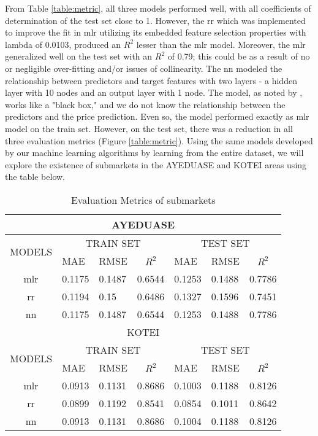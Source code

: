 \begin{sloppypar}
	\hspace*{-0.6cm}From Table \ref{table:metric}, all three models performed well, with all coefficients of determination of the test set close to 1. However, the \ac{rr} which was implemented to improve the fit in \ac{mlr} utilizing its embedded feature selection properties with lambda of 0.0103, produced an $ R^2 $ lesser than the \ac{mlr} model. Moreover, the \ac{mlr} generalized well on the test set with an $ R^2 $ of 0.79; this could be as a result of no or negligible over-fitting and/or issues of collinearity. \newline
	The \ac{nn} modeled the relationship between predictors and target features with two layers - a hidden layer with 10 nodes and an output layer with 1 node. The model, as noted by \citep{Phan2019}, works like a "black box," and we do not know the relationship between the predictors and the price prediction. Even so, the model performed exactly as \ac{mlr} model on the train set. However, on the test set, there was a reduction in all three evaluation metrics (Figure \ref{table:metric}).
	\newpage  
	\hspace*{-0.6cm}Using the same models developed by our machine learning algorithms by learning from the entire dataset, we will explore the existence of submarkets \citep{maclennan1996economic} in the AYEDUASE and KOTEI areas using the table below.
	
	\begin{table}[h!]
		\centering
		\caption{Evaluation Metrics of submarkets}
		\label{table:metric2}
		\begin{tabular}{|c|p{1.5cm}p{1.5cm}c|p{1.5cm}p{1.5cm}c|}
			\hline
			\multicolumn{7}{|c|}{AYEDUASE} \\
			\hline \hline
			\multirow{2}{*}{MODELS} & \multicolumn{3}{|c|}{TRAIN SET} & \multicolumn{3}{|c|}{TEST SET} \\ \cline{2-7}
			& MAE & RMSE & $R^2$ & MAE & RMSE & $R^2$ \\ \hline
			\ac{mlr} & 0.1175 & 0.1487 & 0.6544 & 0.1253 & 0.1488 & 0.7786 \\
			\ac{rr} & 0.1194 & 0.15 & 0.6486 & 0.1327 & 0.1596 & 0.7451 \\
			\ac{nn} & 0.1175 & 0.1487 & 0.6544 & 0.1253 & 0.1488 & 0.7786 \\ \hline \hline
			\multicolumn{7}{|c|}{KOTEI} \\
			\hline \hline
			\multirow{2}{*}{MODELS} & \multicolumn{3}{|c|}{TRAIN SET} & \multicolumn{3}{|c|}{TEST SET} \\ \cline{2-7}
			& MAE & RMSE & $R^2$ & MAE & RMSE & $R^2$ \\ \hline
			\ac{mlr} & 0.0913 & 0.1131 & 0.8686 & 0.1003 & 0.1188 & 0.8126 \\
			\ac{rr} & 0.0899 & 0.1192 & 0.8541 & 0.0854 & 0.1011 & 0.8642 \\
			\ac{nn} & 0.0913 & 0.1131 & 0.8686 & 0.1004 & 0.1188 & 0.8126 \\ \hline
		\end{tabular}
	\end{table}
	

\end{sloppypar}
